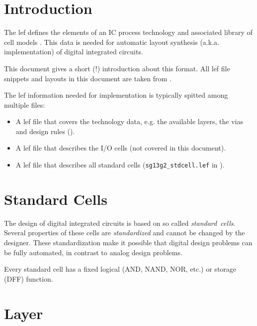 \documentclass{article}[11pt]
\begin{document}
\notetitle

\section{Introduction}

The \gls{lef} defines the elements of an IC process technology and associated 
library of cell models \cite{cds-lefdeflangref57-09}.
This data is needed for automatic layout synthesis (a.k.a. implementation)
of digital integrated circuits.

This document gives a short (!) introduction about this format.
All \gls{lef} file snippets and layouts in this document are taken 
from \cite{ihp-pdk}.

The \gls{lef} information needed for implementation is typically
spitted among multiple files:
\begin{itemize}
  \item A \gls{lef} file that covers the technology data, e.g. the available 
    layers, the vias and design rules ().
  \item A \gls{lef} file that describes the I/O cells 
    (not covered in this document).
  \item A \gls{lef} file that describes all standard cells
    (\texttt{sg13g2\_stdcell.lef} in \cite{ihp-pdk}).
\end{itemize}

\section{Standard Cells}

The design of digital integrated circuits is based on so called 
\textit{standard~cells}.
Several properties of these cells are \textit{standardized} and cannot be
changed by the designer.
These standardization make it possible that digital design problems
can be fully automated, in contrast to analog design problems.

Every standard cell has a fixed logical (AND, NAND, NOR, etc.) or 
storage (DFF) function.



\section{Layer}
\end{document}
